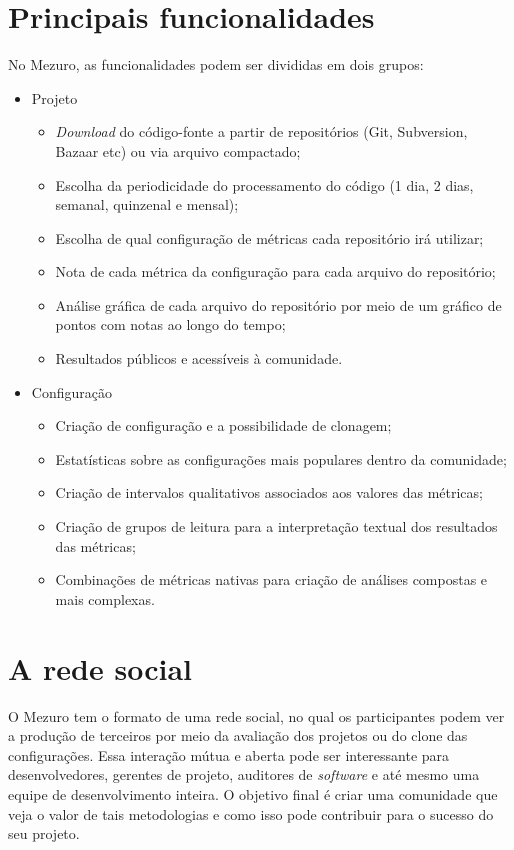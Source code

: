 \documentclass{llncs}
\begin{document}
\section{Principais funcionalidades}\label{sec:princ-funcionalidades}
No Mezuro, as funcionalidades podem ser divididas em dois grupos:
\begin{itemize}
  \item Projeto
    \begin{itemize}
    \item \textit{Download} do código-fonte a partir de repositórios (Git, Subversion, Bazaar etc) ou via arquivo compactado;
        \item Escolha da periodicidade do processamento do código (1 dia, 2 dias, semanal, quinzenal e mensal);
        \item Escolha de qual configuração de métricas cada repositório irá utilizar;
        \item Nota de cada métrica da configuração para cada arquivo do repositório;
        \item Análise gráfica de cada arquivo do repositório por meio de um gráfico de pontos com notas ao longo do tempo;
        \item Resultados públicos e acessíveis à comunidade.
    \end{itemize}
    \item Configuração
    \begin{itemize}
    \item Criação de configuração e a possibilidade de clonagem;
        \item Estatísticas sobre as configurações mais populares dentro da comunidade;
        \item Criação de intervalos qualitativos associados aos valores das métricas;
        \item Criação de grupos de leitura para a interpretação textual dos resultados das métricas;
        \item Combinações de métricas nativas para criação de análises compostas e mais complexas.
    \end{itemize}
\end{itemize}

\section{A rede social}\label{sec:user-potencial}
O Mezuro tem o formato de uma rede social, no qual os participantes podem ver a produção de terceiros por meio da avaliação dos projetos ou do clone das configurações. Essa interação mútua e aberta pode ser interessante para desenvolvedores, gerentes de projeto, auditores de \textit{software} e até mesmo uma equipe de desenvolvimento inteira. O objetivo final é criar uma comunidade que veja o valor de tais metodologias e como isso pode contribuir para o sucesso do seu projeto.
\end{document}
